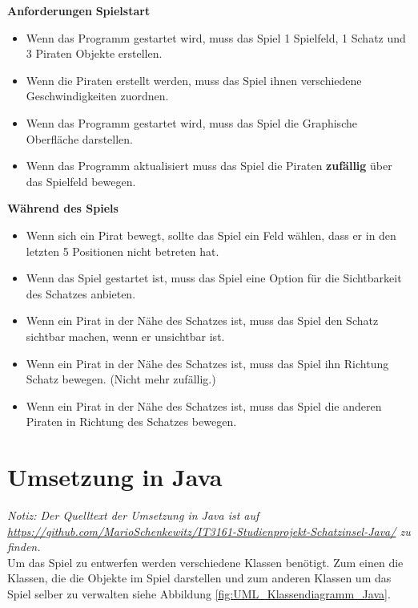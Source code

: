 \documentclass[
	12pt, %
	a4paper,
	listof=totoc, %
	bibliography=totoc, %
	numbers=noenddot, %
	ngerman, %
	headsepline, %
	oneside %
	]{scrbook} %
\begin{document}
\textbf{Anforderungen}
\textbf{Spielstart}
\begin{itemize}\vspace{-1em}
\setlength{\itemsep}{-1em}
	\item Wenn das Programm gestartet wird, muss das Spiel 1 Spielfeld, 1 Schatz und 3 Piraten Objekte erstellen.
	\item Wenn die Piraten erstellt werden, muss das Spiel ihnen verschiedene Geschwindigkeiten zuordnen.
	\item Wenn das Programm gestartet wird, muss das Spiel die Graphische Oberfläche darstellen.
	\item Wenn das Programm aktualisiert muss das Spiel die Piraten \textbf{zufällig} über das Spielfeld bewegen.
\end{itemize}

\textbf{Während des Spiels}
\begin{itemize}\vspace{-1em}
\setlength{\itemsep}{-1em}
	\item Wenn sich ein Pirat bewegt, sollte das Spiel ein Feld wählen, dass er in den letzten 5 Positionen nicht betreten hat.
	\item Wenn das Spiel gestartet ist, muss das Spiel eine Option für die Sichtbarkeit des Schatzes anbieten.
	\item Wenn ein Pirat in der Nähe des Schatzes ist, muss das Spiel den Schatz sichtbar machen, wenn er unsichtbar ist.
	\item Wenn ein Pirat in der Nähe des Schatzes ist, muss das Spiel ihn Richtung Schatz bewegen. (Nicht mehr zufällig.)
	\item Wenn ein Pirat in der Nähe des Schatzes ist, muss das Spiel die anderen Piraten in Richtung des Schatzes bewegen.
\end{itemize}

\section{Umsetzung in Java}\label{sec:Umsetzung_Java}
\emph{Notiz: Der Quelltext der Umsetzung in Java ist auf \url{https://github.com/MarioSchenkewitz/IT3161-Studienprojekt-Schatzinsel-Java/} zu finden.}\\

Um das Spiel zu entwerfen werden verschiedene Klassen benötigt. Zum einen die Klassen, die die Objekte im Spiel darstellen und zum anderen Klassen um das Spiel selber zu verwalten siehe Abbildung \ref{fig:UML_Klassendiagramm_Java}.
\end{document}
